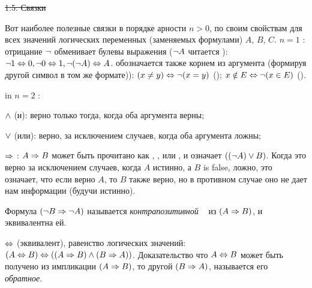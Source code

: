 \st{1.5. Связки}


 Вот наиболее полезные связки в порядке арности $n > 0$, по своим свойствам для всех значений логических переменных (заменяемых формулами) $A$, $B$, $C$.
\smallskip
\noindent $n=1$ : отрицание $\neg$ обменивает булевы выражения ($\neg A$ читается ): 
$\neg1\Leftrightarrow0, \neg0\Leftrightarrow1, \neg(\neg A)\Leftrightarrow A$. обозначается также корнем из аргумента (формируя другой символ в том же формате)):   $(x\not=y)\Leftrightarrow\neg(x=y)$ (); $x\notin E\Leftrightarrow\neg(x\in E)$ (). 


in
\smallbreak
\noindent $n=2$ :

$\wedge$ (и): верно только тогда, когда оба аргумента верны;

$\vee$ (или): верно, за исключением случаев, когда оба аргумента ложны;

$\Rightarrow$ : $A\Rightarrow B$ может быть прочитано как , , или , и означает $((\neg A) \vee B)$. Когда это верно за исключением случаев, когда $A$ истинно, а $B$ is false, ложно, это означает, что если верно $A$, то $B$ также верно, но в противном случае оно не дает нам информации (будучи истинно).

Формула $(\neg B\Rightarrow \neg A)$ называется {\it контрапозитивной \ } из $(A\Rightarrow B)$, и эквивалентна ей.

$\Leftrightarrow$ (эквивалент), равенство логических значений: $(A\Leftrightarrow B)\Leftrightarrow((A\Rightarrow B)\wedge (B\Rightarrow A))$. Доказательство что $A\Leftrightarrow B$ может быть получено из импликации $(A\Rightarrow B)$, то другой $(B\Rightarrow A)$, называется его {\it обратное}.

